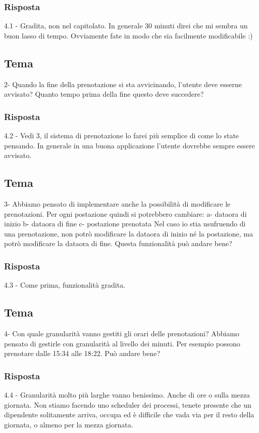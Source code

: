 \subsubsection{Risposta}
4.1 - Gradita, non nel capitolato. In generale 30 minuti direi che mi sembra un buon lasso di tempo. Ovviamente fate in modo che sia facilmente modificabile :)

\subsection*{Tema}
2- Quando la fine della prenotazione si sta avvicinando, l'utente deve esserne avvisato? Quanto tempo prima della fine questo deve succedere?
\subsubsection{Risposta}
4.2 - Vedi 3, il sistema di prenotazione lo farei più semplice di come lo state pensando. In generale in una buona applicazione l'utente dovrebbe sempre essere avvisato.\\

\subsection*{Tema}
3- Abbiamo pensato di implementare anche la possibilità di modificare le prenotazioni. Per ogni postazione quindi si potrebbero cambiare:
a- dataora di inizio
b- dataora di fine
c- postazione prenotata
Nel caso io stia usufruendo di una prenotazione, non potrò modificare la dataora di inizio né la postazione, ma potrò modificare la dataora di fine.
Questa funzionalità può andare bene?
\subsubsection{Risposta}
4.3 - Come prima, funzionalità gradita.\\

\subsection*{Tema}
4- Con quale granularità vanno gestiti gli orari delle prenotazioni? Abbiamo pensato di gestirle con granularità al livello dei minuti. Per esempio possono prenotare dalle 15:34 alle 18:22. Può andare bene?
\subsubsection{Risposta}
4.4 - Granularità molto più larghe vanno benissimo. Anche di ore o sulla mezza giornata. Non stiamo facendo uno scheduler dei processi, tenete presente che un dipendente solitamente arriva, occupa ed è difficile che vada via per il resto della giornata, o almeno per la mezza giornata.


